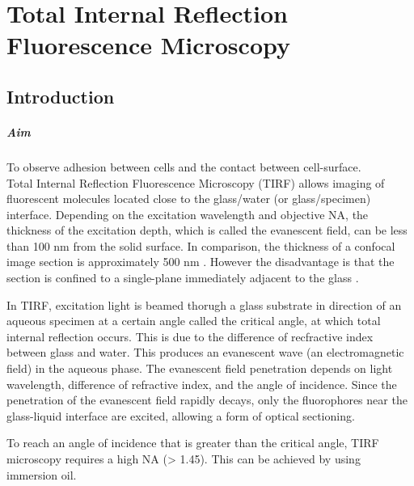 
\chapter{Total Internal Reflection Fluorescence Microscopy}
\label{chp:TIRF}

\section{Introduction}

\paragraph{Aim} To observe adhesion between cells and the contact between cell-surface.
\\

Total Internal Reflection Fluorescence Microscopy (TIRF) allows imaging of fluorescent molecules located close to the glass/water (or glass/specimen) interface. 
Depending on the excitation wavelength and objective NA, the thickness of the excitation depth, which is called the evanescent field, can be less than 100 nm from the solid surface. 
In comparison, the thickness of a confocal image section is approximately 500 nm \cite{Fish2009}. 
However the disadvantage is that the section is confined to a single-plane immediately adjacent to the glass \cite{Sanderson2014}.

In TIRF, excitation light is beamed thorugh a glass substrate in direction of an aqueous specimen at a certain angle called the critical angle, at which total internal reflection occurs. 
This is due to the difference of recfractive index between glass and water. This produces an evanescent wave (an electromagnetic field) in the aqueous phase. 
The evanescent field penetration depends on light wavelength, difference of refractive index, and the angle of incidence. 
Since the penetration of the evanescent field rapidly decays, only the fluorophores near the glass-liquid interface are excited, allowing a form of optical sectioning. 

To reach an angle of incidence that is greater than the critical angle, TIRF microscopy requires a high NA (> 1.45). This can be achieved by using immersion oil.
%

